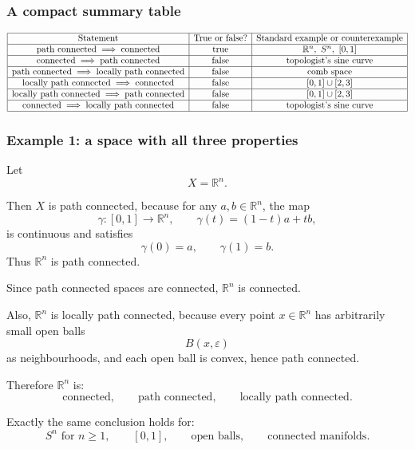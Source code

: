 \documentclass[12pt,a4paper]{article}
\theoremstyle{notespace}
\begin{document}
\subsubsection{A compact summary table}

\[
\begin{array}{|c|c|c|}
	\hline
	\text{Statement} & \text{True or false?} & \text{Standard example or counterexample} \\
	\hline
	\text{path connected} \implies \text{connected} & \text{true} & \mathbb{R}^n,\ S^n,\ [0,1] \\
	\hline
	\text{connected} \implies \text{path connected} & \text{false} & \text{topologist's sine curve} \\
	\hline
	\text{path connected} \implies \text{locally path connected} & \text{false} & \text{comb space} \\
	\hline
	\text{locally path connected} \implies \text{connected} & \text{false} & [0,1]\cup[2,3] \\
	\hline
	\text{locally path connected} \implies \text{path connected} & \text{false} & [0,1]\cup[2,3] \\
	\hline
	\text{connected} \implies \text{locally path connected} & \text{false} & \text{topologist's sine curve} \\
	\hline
\end{array}
\]

\subsubsection{Example 1: a space with all three properties}

Let
\[
X=\mathbb{R}^n.
\]

Then \(X\) is path connected, because for any \(a,b\in \mathbb{R}^n\), the map
\[
\gamma:[0,1]\to \mathbb{R}^n,
\qquad
\gamma(t)=(1-t)a+tb,
\]
is continuous and satisfies
\[
\gamma(0)=a,
\qquad
\gamma(1)=b.
\]
Thus \(\mathbb{R}^n\) is path connected.

Since path connected spaces are connected, \(\mathbb{R}^n\) is connected.

Also, \(\mathbb{R}^n\) is locally path connected, because every point \(x\in \mathbb{R}^n\) has arbitrarily small open balls
\[
B(x,\varepsilon)
\]
as neighbourhoods, and each open ball is convex, hence path connected.

Therefore \(\mathbb{R}^n\) is:
\[
\text{connected},\qquad \text{path connected},\qquad \text{locally path connected}.
\]

Exactly the same conclusion holds for:
\[
S^n \text{ for } n\geq 1,\qquad [0,1],\qquad \text{open balls},\qquad \text{connected manifolds}.
\]
\end{document}
